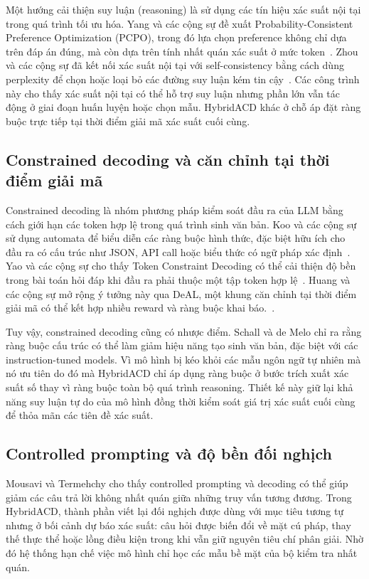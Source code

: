 \documentclass[pdflatex,sn-mathphys-num,oneside]{sn-jnl}
\begin{document}
Một hướng cải thiện suy luận (reasoning) là sử dụng các tín hiệu xác suất nội tại trong quá trình tối ưu hóa. Yang và các cộng sự đề xuất Probability-Consistent Preference Optimization (PCPO), trong đó lựa chọn preference không chỉ dựa trên đáp án đúng, mà còn dựa trên tính nhất quán xác suất ở mức token\ \cite{ref3}. Zhou và các cộng sự đã kết nối xác suất nội tại với self-consistency bằng cách dùng perplexity để chọn hoặc loại bỏ các đường suy luận kém tin cậy\ \cite{ref6}. Các công trình này cho thấy xác suất nội tại có thể hỗ trợ suy luận nhưng phần lớn vẫn tác động ở giai đoạn huấn luyện hoặc chọn mẫu. HybridACD khác ở chỗ áp đặt ràng buộc trực tiếp tại thời điểm giải mã xác suất cuối cùng.

\subsection{Constrained decoding và căn chỉnh tại thời điểm giải mã}

Constrained decoding là nhóm phương pháp kiểm soát đầu ra của LLM bằng cách giới hạn các token hợp lệ trong quá trình sinh văn bản. Koo và các cộng sự sử dụng automata để biểu diễn các ràng buộc hình thức, đặc biệt hữu ích cho đầu ra có cấu trúc như JSON, API call hoặc biểu thức có ngữ pháp xác định\ \cite{ref7}. Yao và các cộng sự cho thấy Token Constraint Decoding có thể cải thiện độ bền trong bài toán hỏi đáp khi đầu ra phải thuộc một tập token hợp lệ\ \cite{ref9}. Huang và các cộng sự mở rộng ý tưởng này qua DeAL, một khung căn chỉnh tại thời điểm giải mã có thể kết hợp nhiều reward và ràng buộc khai báo.\ \cite{ref11}.

Tuy vậy, constrained decoding cũng có nhược điểm. Schall và de Melo chỉ ra rằng ràng buộc cấu trúc có thể làm giảm hiệu năng tạo sinh văn bản, đặc biệt với các instruction-tuned models. Vì mô hình bị kéo khỏi các mẫu ngôn ngữ tự nhiên mà nó ưu tiên \cite{ref10} do đó mà HybridACD chỉ áp dụng ràng buộc ở bước trích xuất xác suất số thay vì ràng buộc toàn bộ quá trình reasoning. Thiết kế này giữ lại khả năng suy luận tự do của mô hình đồng thời kiểm soát giá trị xác suất cuối cùng để thỏa mãn các tiên đề xác suất.

\subsection{Controlled prompting và độ bền đối nghịch}

Mousavi và Termehchy \cite{ref8} cho thấy controlled prompting và decoding có thể giúp giảm các câu trả lời không nhất quán giữa những truy vấn tương đương. Trong HybridACD, thành phần viết lại đối nghịch được dùng với mục tiêu tương tự nhưng ở bối cảnh dự báo xác suất: câu hỏi được biến đổi về mặt cú pháp, thay thế thực thể hoặc lồng điều kiện trong khi vẫn giữ nguyên tiêu chí phân giải. Nhờ đó hệ thống hạn chế việc mô hình chỉ học các mẫu bề mặt của bộ kiểm tra nhất quán.
\end{document}
